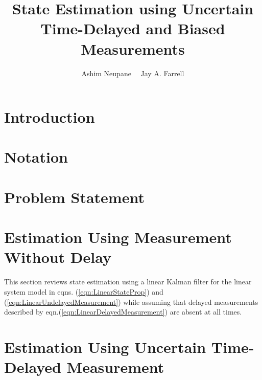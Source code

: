 
\usepackage{tikz}
\usepackage{wrapfig}
\usepackage{caption}
\usepackage{stfloats}
\DeclareMathAlphabet{}


\title{State Estimation using Uncertain Time-Delayed and Biased Measurements}
\author{Ashim Neupane \ \ Jay A. Farrell
}%

\maketitle

		
\section{Introduction}	
	
	
\section{Notation}	\label{sect:notation}
	

\section{Problem Statement}\label{sect:problem_statement}
	

\section{Estimation Using Measurement Without Delay} \label{sect:estimation_no_delayed_msr}
	This section reviews state estimation using a linear Kalman filter for the linear system model in eqns. (\ref{eqn:LinearStateProp}) and (\ref{eqn:LinearUndelayedMeasurement}) while assuming that delayed measurements described by eqn.(\ref{eqn:LinearDelayedMeasurement}) are absent at all times.\\
		
%	
	

\section{Estimation Using Uncertain Time-Delayed Measurement} \label{sect:estimation_delayed_msr}	
	
	
